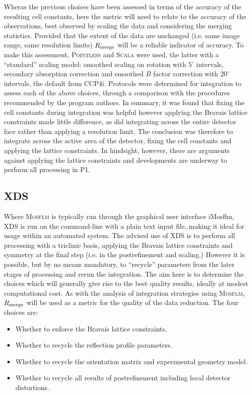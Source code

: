 \documentclass[preprint,pdf]{iucr}
\begin{document}
Wheras the previous choices have been assessed in terms of the accuracy
of the resulting cell constants, here the metric will need to relate
to the accuracy of the observations, best observed by scaling the data
and considering the merging statistics. Provided that the extent of
the data are unchanged (i.e. same image range, same resolution limits)
$R_{\rm{merge}}$ will be a reliable indicator of accuracy. To make
this assessment, \textsc{Pointless} \cite{Evans:ba5084} and \textsc{Scala} were
used, the latter with a ``standard'' scaling model: smoothed
scaling on rotation with $5^{\circ}$ intervals, secondary absorption
correction and smoothed $B$ factor correction with $20^{\circ}$
intervals, the default from CCP4i.
Protocols were determined for integration to assess each
of the above choices, through a 
comparison with the procedures recommended
by the program authors. In summary, it was found that fixing the cell
constants during integration was helpful however applying the Bravais
lattice constraints made little difference, as did integrating across
the entire detector face rather than applying a resolution limit.
The conclusion was therefore to integrate across the
active area of the detector, fixing the cell constants and applying
the lattice constraints. In hindsight, however, there are arguments
against applying the lattice constraints
and developments are underway to perform all processing in P1.

\subsection{XDS}

Where \textsc{Mosflm} is typically run through the graphical user interface
iMosflm, XDS is run on the command-line with a plain text input file,
making it ideal for usage 
within an automated system. The advised use of XDS is to perform all
processing with a triclinic basis, applying the Bravais lattice
constraints and symmetry
at the final step (i.e. in the postrefinement and scaling.) However it
is possible, but by no means mandatory, to ``recycle'' parameters from
the later stages of processing and rerun the integration. The aim here
is to determine the choices which will generally give rise to the best
quality results, ideally at modest computational cost. As with the
analysis of integration strategies using \textsc{Mosflm}, $R_{\rm{merge}}$ will
be used as a metric for the quality of the data reduction. The four
choices are:

\begin{itemize}
\item{Whether to enforce the Bravais lattice constraints.}
\item{Whether to recycle the reflection profile parameters.}
\item{Whether to recycle the orientation matrix and experimental
    geometry model.}
\item{Whether to recycle all results of postrefinement including local
    detector distortions.}
\end{itemize}
\end{document}
